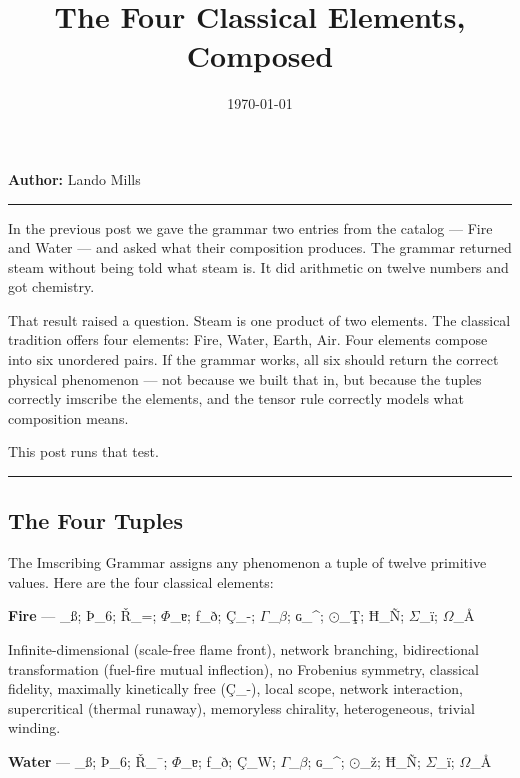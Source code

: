 \documentclass[12pt,a4paper]{article}
\begin{document}
\title{The Four Classical Elements, Composed}
\date{\today}

\maketitle

\textbf{Author:} Lando Mills

\begin{center}
\rule{0.5\textwidth}{0.4pt}
\end{center}

In the previous post we gave the grammar two entries from the catalog --- Fire and Water --- and asked what their composition produces. The grammar returned steam without being told what steam is. It did arithmetic on twelve numbers and got chemistry.

That result raised a question. Steam is one product of two elements. The classical tradition offers four elements: Fire, Water, Earth, Air. Four elements compose into six unordered pairs. If the grammar works, all six should return the correct physical phenomenon --- not because we built that in, but because the tuples correctly imscribe the elements, and the tensor rule correctly models what composition means.

This post runs that test.

\begin{center}
\rule{0.5\textwidth}{0.4pt}
\end{center}

\subsection{The Four Tuples}

The Imscribing Grammar assigns any phenomenon a tuple of twelve primitive values. Here are the four classical elements:

\textbf{Fire} --- \_ß; Þ\_6; Ř\_=; $\Phi$\_ɐ; ƒ\_ð; Ç\_-; $\Gamma$\_$\beta$; ɢ\_\^{}; $\odot$\_Ţ; Ħ\_Ñ; $\Sigma$\_ï; $\Omega$\_Å\rangle

Infinite-dimensional (scale-free flame front), network branching, bidirectional transformation (fuel-fire mutual inflection), no Frobenius symmetry, classical fidelity, maximally kinetically free (Ç\_-), local scope, network interaction, supercritical (thermal runaway), memoryless chirality, heterogeneous, trivial winding.

\textbf{Water} --- \_ß; Þ\_6; Ř\_¯; $\Phi$\_ɐ; ƒ\_ð; Ç\_W; $\Gamma$\_$\beta$; ɢ\_\^{}; $\odot$\_ž; Ħ\_Ñ; $\Sigma$\_ï; $\Omega$\_Å\rangle
\end{document}
